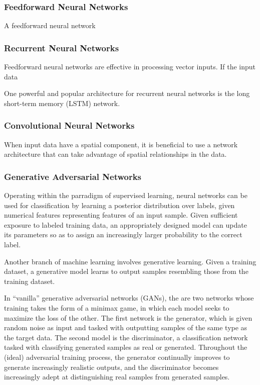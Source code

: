 \subsubsection{Feedforward Neural Networks}
A feedforward neural network 

\subsubsection{Recurrent Neural Networks}
Feedforward neural networks are effective in processing vector inputs. If the input 
data

One powerful and popular architecture for recurrent neural networks is the long
short-term memory (LSTM) network.

\subsubsection{Convolutional Neural Networks}
When input data have a spatial component, it is beneficial to use a network architecture 
that can take advantage of spatial relationships in the data.

\subsubsection{Generative Adversarial Networks}
Operating within the parradigm of supervised learning, neural networks
can be used for classification by learning a posterior distribution over 
labels, given numerical features representing features of an input sample.
Given sufficient exposure to labeled training data, an appropriately designed 
model can update its parameters so as to assign an increasingly larger probability
to the correct label.

Another branch of machine learning involves generative learning. Given a training dataset,
a generative model learns to output samples resembling those from the training dataset. 

In ``vanilla'' generative adversarial networks (GANs), the are two networks whose training 
takes the form of a minimax game, in which each model seeks to maximize the loss of the other.
The first network is the generator, which is given random noise as input and tasked with 
outputting samples of the same type as the target data. The second model is the discriminator,
a classification network tasked with classifying generated samples as real or generated. 
Throughout the (ideal) adversarial training process, the generator continually improves to 
generate increasingly realistic outputs, and the discriminator becomes increasingly adept at 
distinguishing real samples from generated samples.